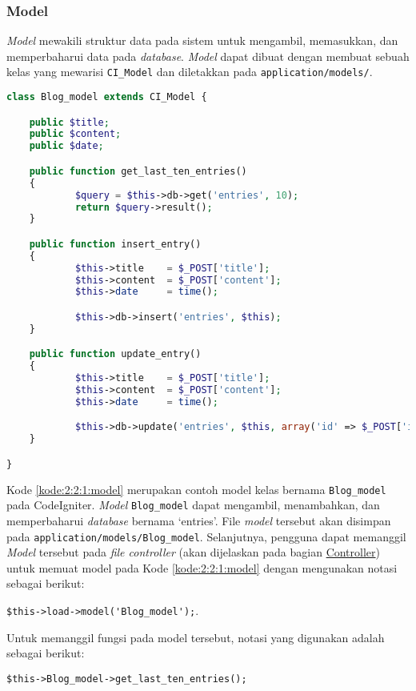 \subsubsection{Model}
\label{sub:2:2:1:model}

\textit{Model} mewakili struktur data pada sistem untuk mengambil, memasukkan, dan memperbaharui data pada \textit{database}. \textit{Model} dapat dibuat dengan membuat sebuah kelas yang mewarisi \verb|CI_Model| dan diletakkan pada \verb|application/models/|.

\begin{lstlisting}[language=php, caption=Contoh \textit{model}, label=kode:2:2:1:model]
class Blog_model extends CI_Model {

	public $title;
	public $content;
	public $date;

	public function get_last_ten_entries()
	{
			$query = $this->db->get('entries', 10);
			return $query->result();
	}

	public function insert_entry()
	{
			$this->title    = $_POST['title'];
			$this->content  = $_POST['content'];
			$this->date     = time();

			$this->db->insert('entries', $this);
	}

	public function update_entry()
	{
			$this->title    = $_POST['title'];
			$this->content  = $_POST['content'];
			$this->date     = time();

			$this->db->update('entries', $this, array('id' => $_POST['id']));
	}

}
\end{lstlisting}

Kode \ref{kode:2:2:1:model} merupakan contoh model kelas bernama \verb|Blog_model| pada CodeIgniter. \textit{Model} \verb|Blog_model| dapat mengambil, menambahkan, dan memperbaharui \textit{database} bernama `entries'. File \textit{model} tersebut akan disimpan pada \verb|application/models/Blog_model|. Selanjutnya, pengguna dapat memanggil \textit{Model} tersebut pada \textit{file controller} (akan dijelaskan pada bagian \hyperref[sub:2:2:3:Controller]{Controller}) untuk memuat model pada Kode \ref{kode:2:2:1:model} dengan mengunakan notasi sebagai berikut:

\begin{center}
	\verb|$this->load->model('Blog_model');|.
\end{center}

Untuk memanggil fungsi pada model tersebut, notasi yang digunakan adalah sebagai berikut:

\begin{center}
	\verb|$this->Blog_model->get_last_ten_entries();|
\end{center}

